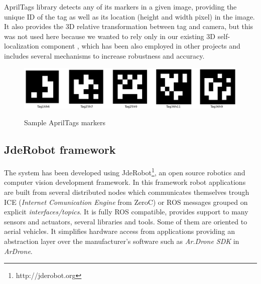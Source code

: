 \documentclass{styles/svproc}
\begin{document}
	AprilTags library detects any of its markers in a given image, providing the unique ID of the tag as well as its location (height and width pixel) in the image. It also provides the 3D relative transformation between tag and camera,
but this was not used here because we wanted to rely only in our existing 3D self-localization component \cite{lopezceron2016}, which has been also employed in other projects and includes several mechanisms to increase robustness and accuracy.
	
	\begin{figure}[h]
		\begin{center}
		{\includegraphics[width=\linewidth]{ejemplosapriltags.png}}
		\end{center}
		\caption{Sample AprilTags markers}
		\label{fig:apriltags}
	\end{figure}
	
\subsection{JdeRobot framework}

	The system has been developed using JdeRobot\footnote{http://jderobot.org}, an open source robotics and computer vision development framework.  In this framework robot applications are built from several distributed nodes which communicates themselves trough ICE (\textit{Internet Comunication Engine} from ZeroC) or ROS messages grouped on explicit \textit{interfaces/topics}. It is fully ROS compatible, provides support to many sensors and actuators, several libraries and tools. Some of them are oriented to aerial vehicles. It simplifies hardware access from applications providing an abstraction layer over the manufacturer's software such as \textit{Ar.Drone SDK} in \textit{ArDrone}.

\end{document}
